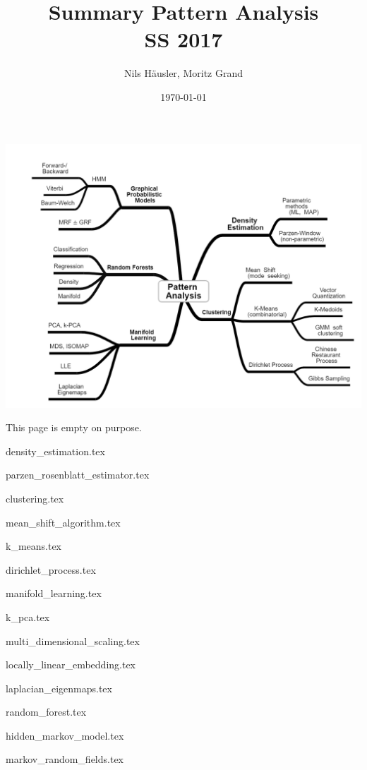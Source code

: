 \documentclass[12p]{article}
\title{Summary Pattern Analysis\\ SS 2017}
\author{Nils Häusler, Moritz Grand}
\date{\today}
\begin{document}
\begin{titlepage}
  \thispagestyle{empty}
  \maketitle
  \includegraphics[width=\textwidth]{overview.png}
\end{titlepage}

{\centering
	This page is empty on purpose.\par
}

\newpage
{density_estimation.tex}

\newpage
{parzen_rosenblatt_estimator.tex}

\newpage
{clustering.tex}

\newpage
{mean_shift_algorithm.tex}

\newpage
{k_means.tex}

\newpage
{dirichlet_process.tex}

\newpage
{manifold_learning.tex}

\newpage
{k_pca.tex}

\newpage
{multi_dimensional_scaling.tex}

\newpage
{locally_linear_embedding.tex}

\newpage
{laplacian_eigenmaps.tex}

\newpage
{random_forest.tex}

\newpage
{hidden_markov_model.tex}

\newpage
{markov_random_fields.tex}
\end{document}
